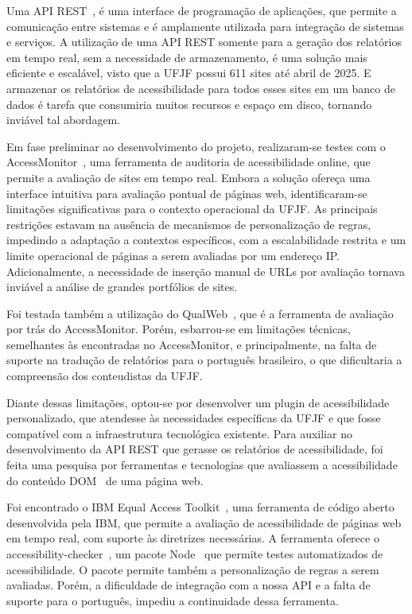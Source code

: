 \documentclass[
	article,			%
	12pt,				%
	oneside,			%
	a4paper,			%
	section=TITLE,		%
	subsection=TITLE,	%
	english,			%
	brazil,				%
	sumario=tradicional
	]{abntex2}
\begin{document}
Uma API REST~\cite{api}, é uma interface de programação de aplicações, que
permite a comunicação entre sistemas e é amplamente utilizada para integração
de sistemas e serviços. A utilização de uma API REST somente para a geração
dos relatórios em tempo real, sem a necessidade de armazenamento, é uma
solução mais eficiente e escalável, visto que a UFJF possui 
611 sites até abril de 2025. E armazenar os
relatórios de acessibilidade para todos esses sites em um banco de dados é tarefa que consumiria
muitos recursos e espaço em disco, tornando inviável tal abordagem.

Em fase preliminar ao desenvolvimento do projeto, realizaram-se testes com o
AccessMonitor~\cite{AM},
uma ferramenta de auditoria de acessibilidade online, que permite a avaliação de
sites em tempo real. Embora a solução ofereça uma interface intuitiva para
avaliação pontual de páginas web, identificaram-se limitações significativas para o
contexto operacional da UFJF. As principais restrições estavam na ausência de
mecanismos de personalização de regras, impedindo a adaptação a contextos
específicos, com a escalabilidade restrita e um limite operacional de páginas a
serem avaliadas por um endereço IP\@. Adicionalmente, a necessidade de inserção
manual de URLs por avaliação tornava inviável a análise de grandes portfólios de
sites\@.

Foi testada também a utilização do QualWeb~\cite{qualweb}, que é a ferramenta
de avaliação por trás do AccessMonitor. Porém, esbarrou-se em limitações técnicas,
semelhantes às encontradas no AccessMonitor, e principalmente, na falta de suporte
na tradução de relatórios para o português brasileiro, o que dificultaria a compreensão dos
conteudistas da UFJF\@.

Diante dessas limitações, optou-se por desenvolver um plugin de acessibilidade
personalizado, que atendesse às necessidades específicas da UFJF e que fosse
compatível com a infraestrutura tecnológica existente. Para auxiliar no
desenvolvimento da API REST que gerasse os relatórios de acessibilidade,
foi feita uma pesquisa por ferramentas e tecnologias que avaliassem a acessibilidade
do conteúdo DOM~\cite{DOM} de uma página web.

Foi encontrado o IBM Equal Access Toolkit~\cite{IBMa}, uma ferramenta de código
aberto desenvolvida pela IBM, que permite a avaliação de acessibilidade de páginas
web em tempo real, com suporte às diretrizes necessárias. A ferramenta oferece
o accessibility-checker~\cite{AC}, um pacote Node~\cite{Node} que permite 
testes automatizados de acessibilidade. O pacote permite também a personalização de
regras a serem avaliadas. Porém, a dificuldade de integração com a nossa API e a falta de suporte para o
português, impediu a continuidade dessa ferramenta.
\end{document}
